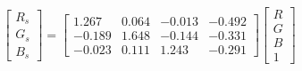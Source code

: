 \begin{equation}
\begin{bmatrix}
  R_s \\ G_s \\ B_s 
\end{bmatrix}=
\left[\begin{matrix}1.267 & 0.064 & -0.013 & -0.492\\ 
-0.189 & 1.648 & -0.144 & -0.331\\ 
-0.023 & 0.111 & 1.243 & -0.291\end{matrix}\right]
\begin{bmatrix}
  R \\ G \\ B \\ 1 
\end{bmatrix}
\end{equation}
